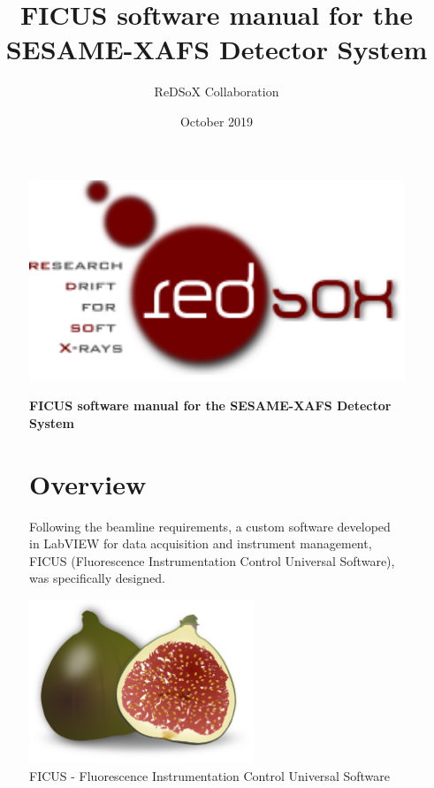 \documentclass[a4paper,12pt,oneside,pdflatex,italian,final,twocolumn]{article}
\title{FICUS software manual for the SESAME-XAFS Detector System}
\author{ReDSoX Collaboration}
\date{October 2019}
\begin{document}
\pagestyle{fancy}

\chead {\today}


\onecolumn

\begin{figure}
\begin{minipage}{0.37\textwidth}
\centering
\includegraphics[width=1\textwidth,left,]{logo_redsox.png}
\end{minipage}
\hfill
\begin{minipage}{0.57\textwidth}
\raggedleft
\vspace{1cm}
\Huge \textbf{FICUS software manual for the SESAME-XAFS Detector System}
    \vspace{2cm}
\end{minipage}
\end{figure}

    
    \tableofcontents 
    
    \vspace{1cm}


\begin{figure} [h]
\begin{minipage}{0.5\textwidth}
\section{Overview}
        Following the beamline requirements, a custom software developed in LabVIEW for data acquisition and instrument management, FICUS (Fluorescence Instrumentation Control Universal Software), was specifically designed.
        

\end{minipage}
\hfill
\begin{minipage}{0.4\textwidth}
\raggedleft
\includegraphics[width=0.6\textwidth,right]{ficus.png}
\caption{FICUS - Fluorescence Instrumentation Control Universal Software}\label{fig:fig0}
\end{minipage}
\end{figure}
\end{document}
